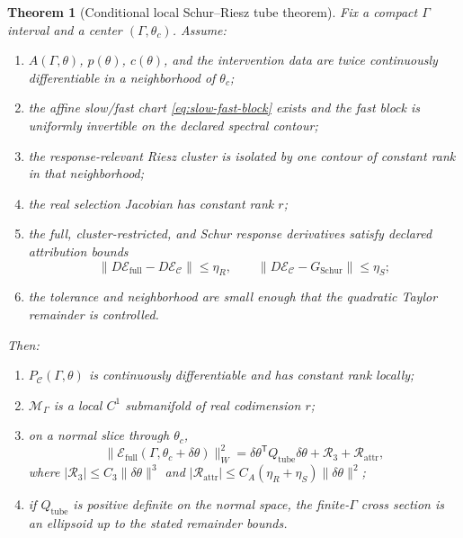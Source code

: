 \documentclass[11pt]{article}
\newtheorem{theorem}{Theorem}[section]
\theoremstyle{definition}
\theoremstyle{remark}
\newcommand{\cC}{\mathcal C}
\newcommand{\cM}{\mathcal M}
\newcommand{\cE}{\mathcal E}
\begin{document}
\begin{theorem}[Conditional local Schur--Riesz tube theorem]\label{thm:local-tube}
Fix a compact $\Gamma$ interval and a center $(\Gamma,\theta_c)$. Assume:
\begin{enumerate}[label=\textbf{T\arabic*.}]
  \item $A(\Gamma,\theta)$, $p(\theta)$, $c(\theta)$, and the intervention data are twice continuously differentiable in a neighborhood of $\theta_c$;
  \item the affine slow/fast chart \eqref{eq:slow-fast-block} exists and the fast block is uniformly invertible on the declared spectral contour;
  \item the response-relevant Riesz cluster is isolated by one contour of constant rank in that neighborhood;
  \item the real selection Jacobian has constant rank $r$;
  \item the full, cluster-restricted, and Schur response derivatives satisfy declared attribution bounds
  \begin{equation}
  \|D\cE_{\mathrm{full}}-D\cE_{\cC}\|\le\eta_R,
  \qquad
  \|D\cE_{\cC}-G_{\mathrm{Schur}}\|\le\eta_S;
  \label{eq:attribution-bounds}
  \end{equation}
  \item the tolerance and neighborhood are small enough that the quadratic Taylor remainder is controlled.
\end{enumerate}
Then:
\begin{enumerate}[label=(\roman*)]
  \item $P_{\cC}(\Gamma,\theta)$ is continuously differentiable and has constant rank locally;
  \item $\cM_\Gamma$ is a local $C^1$ submanifold of real codimension $r$;
  \item on a normal slice through $\theta_c$,
  \begin{equation}
  \|\cE_{\mathrm{full}}(\Gamma,\theta_c+\delta\theta)\|_W^2
  =
  \delta\theta^{\mathsf T}Q_{\mathrm{tube}}\delta\theta
  +\mathcal R_3
  +\mathcal R_{\mathrm{attr}},
  \label{eq:local-tube-expansion}
  \end{equation}
  where $|\mathcal R_3|\le C_3\|\delta\theta\|^3$ and $|\mathcal R_{\mathrm{attr}}|\le C_A(\eta_R+\eta_S)\|\delta\theta\|^2$;
  \item if $Q_{\mathrm{tube}}$ is positive definite on the normal space, the finite-$\Gamma$ cross section is an ellipsoid up to the stated remainder bounds.
\end{enumerate}
\end{theorem}
\end{document}
